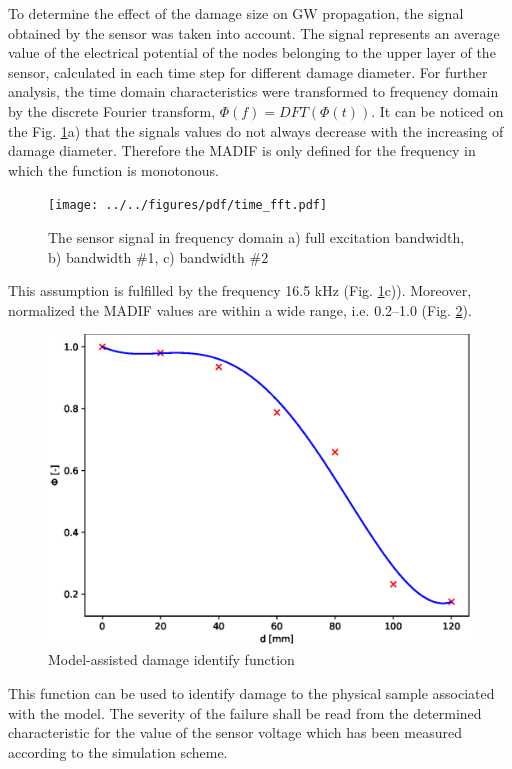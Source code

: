 \documentclass[materials,article,submit,moreauthors,pdftex]{Definitions/mdpi}
\begin{document}
{To determine the effect of the damage size on GW propagation, the signal obtained by the sensor was taken into account.
The signal represents an average value of the electrical potential of the nodes belonging to the upper layer of the sensor, calculated in each time step for different damage diameter.
For further analysis, the time domain characteristics were transformed to frequency domain by the discrete Fourier transform, \(\Phi(f)=DFT(\Phi(t))\).
It can be noticed on the Fig. \ref{fig:signals}a) that the signals values do not always decrease with the increasing of damage diameter.
Therefore the MADIF is only defined for the frequency in which the function is monotonous.
\begin{figure}
	\begin{center}
		\texttt{[image: ../../figures/pdf/time\_fft.pdf]}
	\end{center}
	\caption{The sensor signal in frequency domain a) full excitation bandwidth, b) bandwidth \#1, c) bandwidth \#2}
	\label{fig:signals}
\end{figure}
This assumption is fulfilled by the frequency 16.5 kHz (Fig. \ref{fig:signals}c)).
Moreover, normalized the MADIF values are within a wide range, i.e. 0.2--1.0 (Fig. \ref{fig:madif}).
\begin{figure}
	\begin{center}
		\includegraphics[width=1\linewidth]{../../figures/eps/madif.eps}
	\end{center}
	\caption{Model-assisted damage identify function}
	\label{fig:madif}
\end{figure}
This function can be used to identify damage to the physical sample associated with the model.
The severity of the failure shall be read from the determined characteristic for the value of the sensor voltage which has been measured according to the simulation scheme.
}
\end{document}
